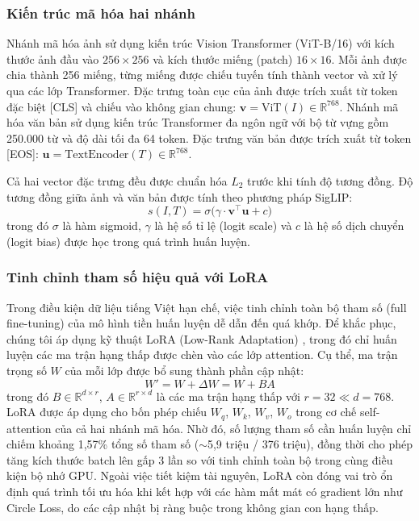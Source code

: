 \documentclass{jstarticle}
\begin{document}
\subsubsection{Kiến trúc mã hóa hai nhánh}
Nhánh mã hóa ảnh sử dụng kiến trúc Vision Transformer (ViT-B/16) với kích thước ảnh đầu vào $256 \times 256$ và kích thước miếng (patch) $16 \times 16$. Mỗi ảnh được chia thành 256 miếng, từng miếng được chiếu tuyến tính thành vector và xử lý qua các lớp Transformer. Đặc trưng toàn cục của ảnh được trích xuất từ token đặc biệt [CLS] và chiếu vào không gian chung: $\mathbf{v} = \text{ViT}(I) \in \mathbb{R}^{768}$. Nhánh mã hóa văn bản sử dụng kiến trúc Transformer đa ngôn ngữ với bộ từ vựng gồm 250.000 từ và độ dài tối đa 64 token. Đặc trưng văn bản được trích xuất từ token [EOS]: $\mathbf{u} = \text{TextEncoder}(T) \in \mathbb{R}^{768}$.

Cả hai vector đặc trưng đều được chuẩn hóa $L_2$ trước khi tính độ tương đồng. Độ tương đồng giữa ảnh và văn bản được tính theo phương pháp SigLIP:
\begin{equation}
    s(I, T) = \sigma\bigl(\gamma \cdot \mathbf{v}^\top \mathbf{u} + c\bigr)
\label{eq:siglip-sim}
\end{equation}
trong đó $\sigma$ là hàm sigmoid, $\gamma$ là hệ số tỉ lệ (logit scale) và $c$ là hệ số dịch chuyển (logit bias) được học trong quá trình huấn luyện.

\subsubsection{Tinh chỉnh tham số hiệu quả với LoRA}
Trong điều kiện dữ liệu tiếng Việt hạn chế, việc tinh chỉnh toàn bộ tham số (full fine-tuning) của mô hình tiền huấn luyện dễ dẫn đến quá khớp. Để khắc phục, chúng tôi áp dụng kỹ thuật LoRA (Low-Rank Adaptation) \cite{hu2022lora}, trong đó chỉ huấn luyện các ma trận hạng thấp được chèn vào các lớp attention. Cụ thể, ma trận trọng số $W$ của mỗi lớp được bổ sung thành phần cập nhật:
\begin{equation}
    W' = W + \Delta W = W + BA
\label{eq:lora}
\end{equation}
trong đó $B \in \mathbb{R}^{d \times r}$, $A \in \mathbb{R}^{r \times d}$ là các ma trận hạng thấp với $r = 32 \ll d = 768$. LoRA được áp dụng cho bốn phép chiếu $W_q$, $W_k$, $W_v$, $W_o$ trong cơ chế self-attention của cả hai nhánh mã hóa. Nhờ đó, số lượng tham số cần huấn luyện chỉ chiếm khoảng 1,57\% tổng số tham số ($\sim$5,9 triệu / 376 triệu), đồng thời cho phép tăng kích thước batch lên gấp 3 lần so với tinh chỉnh toàn bộ trong cùng điều kiện bộ nhớ GPU. Ngoài việc tiết kiệm tài nguyên, LoRA còn đóng vai trò ổn định quá trình tối ưu hóa khi kết hợp với các hàm mất mát có gradient lớn như Circle Loss, do các cập nhật bị ràng buộc trong không gian con hạng thấp.
\end{document}
